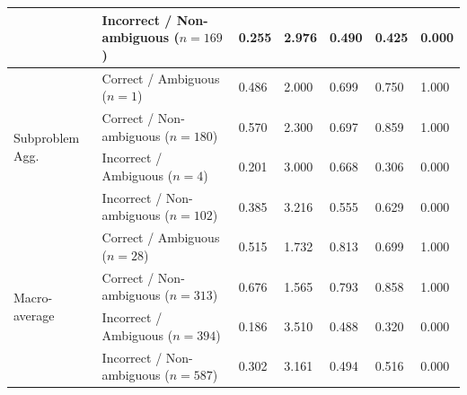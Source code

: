 \begin{table}[htbp]
\begin{tabular}{lllllll}
 & Incorrect / Non-ambiguous ($n=169$) & 0.255 & 2.976 & 0.490 & 0.425 & 0.000 \\
\hline
\multirow{4}{*}{Subproblem Agg.} & Correct / Ambiguous ($n=1$) & 0.486 & 2.000 & 0.699 & 0.750 & 1.000 \\
 & Correct / Non-ambiguous ($n=180$) & 0.570 & 2.300 & 0.697 & 0.859 & 1.000 \\
 & Incorrect / Ambiguous ($n=4$) & 0.201 & 3.000 & 0.668 & 0.306 & 0.000 \\
 & Incorrect / Non-ambiguous ($n=102$) & 0.385 & 3.216 & 0.555 & 0.629 & 0.000 \\
\hline
\multirow{4}{*}{Macro-average} & Correct / Ambiguous ($n=28$) & 0.515 & 1.732 & 0.813 & 0.699 & 1.000 \\
 & Correct / Non-ambiguous ($n=313$) & 0.676 & 1.565 & 0.793 & 0.858 & 1.000 \\
 & Incorrect / Ambiguous ($n=394$) & 0.186 & 3.510 & 0.488 & 0.320 & 0.000 \\
 & Incorrect / Non-ambiguous ($n=587$) & 0.302 & 3.161 & 0.494 & 0.516 & 0.000 \\
\hline
\end{tabular}
\label{tab:refamb-trajectory-quality-by-task-type-correctness-stratified}
\end{table}
